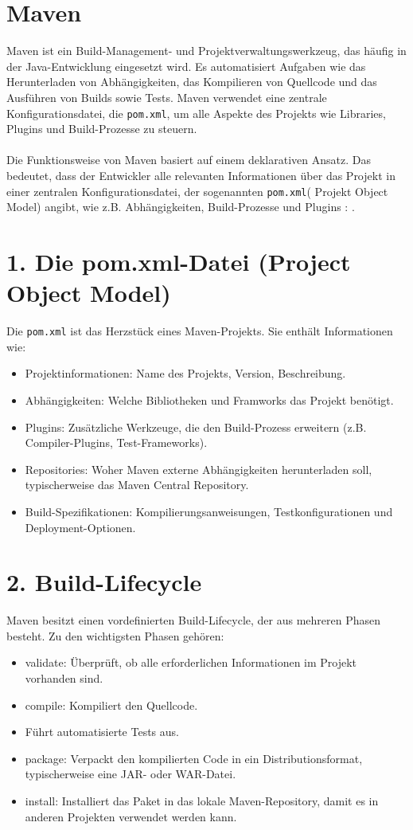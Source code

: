 \documentclass[a4paper,12pt]{scrreprt}
\begin{document}
\section{Maven}
Maven ist ein Build-Management- und Projektverwaltungswerkzeug, das häufig in der Java-Entwicklung eingesetzt wird. Es automatisiert Aufgaben wie das Herunterladen von Abhängigkeiten, das Kompilieren von Quellcode und das Ausführen von Builds sowie Tests. Maven verwendet eine zentrale Konfigurationsdatei, die \texttt{pom.xml}, um alle Aspekte des Projekts wie Libraries, Plugins und Build-Prozesse zu steuern.\\ \\
Die Funktionsweise von Maven basiert auf einem deklarativen Ansatz. Das bedeutet, dass der Entwickler alle relevanten Informationen über das Projekt in einer zentralen Konfigurationsdatei, der sogenannten \texttt{pom.xml}( Projekt Object Model) angibt, wie z.B. Abhängigkeiten, Build-Prozesse und Plugins : \cite{deinhard24}.
\section*{\small \textbf{1. Die pom.xml-Datei (Project Object Model)}}
Die \texttt{pom.xml} ist das Herzstück eines Maven-Projekts. Sie enthält Informationen wie:
\begin{itemize}
\item Projektinformationen: Name des Projekts, Version, Beschreibung.
\item Abhängigkeiten: Welche Bibliotheken und Framworks das Projekt benötigt.
\item Plugins: Zusätzliche Werkzeuge, die den Build-Prozess erweitern (z.B. Compiler-Plugins, Test-Frameworks).
\item Repositories: Woher Maven externe Abhängigkeiten herunterladen soll, typischerweise das Maven Central Repository.
\item Build-Spezifikationen: Kompilierungsanweisungen, Testkonfigurationen und Deployment-Optionen.
\end{itemize}
\section*{\small \textbf{2. Build-Lifecycle}}
Maven besitzt einen vordefinierten Build-Lifecycle, der aus mehreren Phasen besteht. Zu den wichtigsten Phasen gehören:
\begin{itemize}
\item validate: Überprüft, ob alle erforderlichen Informationen im Projekt vorhanden sind.
\item compile: Kompiliert den Quellcode.
\item Führt automatisierte Tests aus.
\item package: Verpackt den kompilierten Code in ein Distributionsformat, typischerweise eine JAR- oder WAR-Datei.
\item install: Installiert das Paket in das lokale Maven-Repository, damit es in anderen Projekten verwendet werden kann.
\end{itemize}
\end{document}
